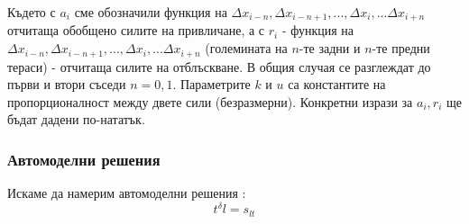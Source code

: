 Където с $a_i$ сме обозначили функция на $\Delta x_{i-n}, \Delta x_{i-n + 1}, ..., \Delta x_{i}, ... \Delta x_{i + n} $ отчитаща обобщено силите на привличане, а с $r_{i}$ - функция на  $\Delta x_{i-n}, \Delta x_{i-n + 1}, ..., \Delta x_{i}, ... \Delta x_{i + n}$ (големината на $n$-те задни и $n$-те предни тераси) - отчитаща силите на отблъскване. В общия случая се разглеждат до първи и втори съседи $n = 0,1$. Параметрите $k$ и $u$ са константите на пропорционалност между двете сили (безразмерни). Конкретни изрази за $a_i, r_i$ ще бъдат дадени по-нататък. 

\subsubsection{Автомоделни решения}
Искаме да намерим автомоделни решения \cite{Barenblatt1996} \cite{Krasteva2016}:
\begin{equation}
    t^\delta l = s_{l t} 
    \label{eq:dimensional_scaling}
\end{equation}

